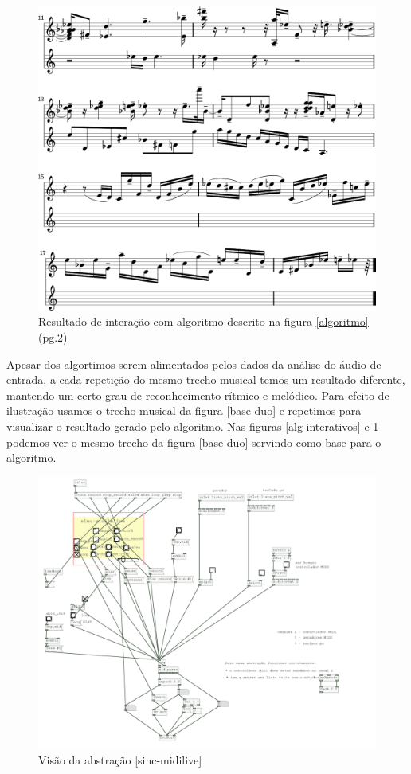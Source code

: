 \documentclass{ppgmus}
\begin{document}
\begin{figure}
\includegraphics[scale=.5]{alg-interativos2}
\caption{Resultado de interação com algoritmo descrito na figura \ref{algoritmo}(pg.2)}
\label{alg-interativos2}
\end{figure}

Apesar dos algortimos serem alimentados pelos dados da análise do áudio de entrada, a cada repetição
do mesmo trecho musical temos um resultado diferente, mantendo um certo grau de reconhecimento
rítmico e melódico. Para efeito de ilustração usamos o trecho musical da figura \ref{base-duo} e repetimos
 para visualizar o resultado gerado pelo algoritmo. Nas figuras \ref{alg-interativos} e \ref{alg-interativos2} podemos
ver o mesmo trecho da figura \ref{base-duo} servindo como base para o algoritmo.


\begin{figure}
\includegraphics[scale=.5]{sinc-midilive}
\caption{Visão da abstração [sinc-midilive]}
\label{sinc-midilive}
\end{figure}
\end{document}
